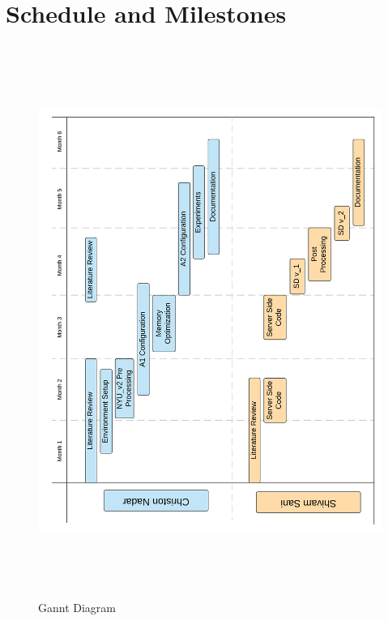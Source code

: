 \section{Schedule and Milestones}
\begin{figure}[h]
\centering
    \includegraphics[width=14cm, height=18cm]{Figures/ganntL2.png}
 \caption{Gannt Diagram}
    \label{fig:Gannt_Dia}
\end{figure}
\newpage

